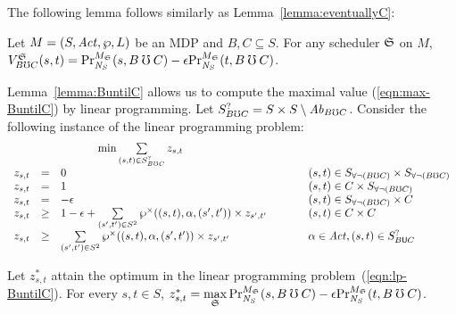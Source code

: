 The following lemma follows similarly as Lemma~\ref{lemma:eventuallyC}:
\begin{lemma}
  Let $M = (S, \Act, \wp, L)$ be an MDP and $B, C \subseteq S$.
  For any scheduler $\scheduler{S}$ on $M$,
  $V^{\scheduler{S}}_{B \guntil C} (s, t) =
  \myPr{s}{M_{\scheduler{S}}}{\neighbor{S}}{B \guntil C} - 
  \epsilon \myPr{t}{M_{\scheduler{S}}}{\neighbor{S}}{B \guntil C}$.  
  \label{lemma:BuntilC}
\end{lemma}

Lemma~\ref{lemma:BuntilC} allows us to compute the maximal value
(\ref{eqn:max-BuntilC}) by linear programming.
Let ${S}^{?}_{B \guntil C} = S \times S \setminus 
\mathit{Ab}_{B \guntil C}$. Consider the following instance of the
linear programming problem: 
\begin{eqnarray}
  \label{eqn:lp-BuntilC}
\begin{array}{rclll}
  \multicolumn{3}{c}{
  \min \sum\limits_{(s, t) \in {S}^{?}_{B \guntil C}} z_{s, t}
  }\\
  z_{s, t} & = & 0 & \hspace{.05\columnwidth} &
  (s, t) \in \neverBuntilC \times \neverBuntilC\\
  z_{s, t} & = & 1 && 
  (s, t) \in C \times \neverBuntilC\\
  z_{s, t} & = & - \epsilon &&
  (s, t) \in \neverBuntilC \times C\\
  z_{s, t} & \geq & 1 - \epsilon +
  \sum\limits_{(s', t') \in {S}^{2}}
   \wp^{\times} ((s, t), \alpha, (s', t')) \times z_{s', t'} && 
  (s, t) \in C \times C\\
  z_{s, t} &\geq& \sum\limits_{(s', t') \in
  {S}^{2}}
   \wp^{\times} ((s, t), \alpha, (s', t')) \times z_{s', t'} 
  &&
  \alpha \in \Act, (s, t) \in {S}^{?}_{B \until C}
\end{array}
\end{eqnarray}

\begin{theorem}
  Let $z^*_{s, t}$ attain the optimum in the linear programming
  problem~(\ref{eqn:lp-BuntilC}). For every $s, t \in S$, 
  $z^*_{s, t} = \max\limits_{\scheduler{S}}
  \myPr{s}{M_{\scheduler{S}}}{\neighbor{S}}{B \guntil C} - 
  \epsilon \myPr{t}{M_{\scheduler{S}}}{\neighbor{S}}{B \guntil C}$.  
  \label{theorem:BuntilC}
\end{theorem}

